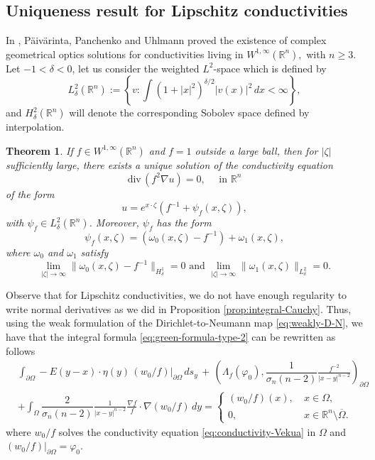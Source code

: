 \documentclass[12pt]{article}
\newtheorem{theorem}{Theorem}
\def\div{\mbox{div}\,}
\def\R{\mathbb{R}}
\begin{document}
\subsection{Uniqueness result for Lipschitz conductivities}
In \cite[Th.\ 1.1]{Paivarinta2003}, P\"{a}iv\"{a}rinta, Panchenko and Uhlmann proved the existence of complex geometrical optics solutions for conductivities living in $W^{1,\infty}(\mathbb{R}^n),$ with $n\geq 3$. Let $-1<\delta<0$, let us consider the weighted $L^2$-space which is defined by 
\[
L_{\delta}^2(\mathbb{R}^n):=\left\{v\colon \int (1+|x|^2)^{\delta/2} |v(x)|^2\, dx<\infty\right\},
\]
and $H_{\delta}^2(\mathbb{R}^n)$ will denote the corresponding Sobolev space defined by interpolation.
\begin{theorem}\cite[Th.\ 1.1]{Paivarinta2003}\label{th:CGO}
If $f\in W^{1,\infty}(\mathbb{R}^n)$ and $f=1$ outside a large ball, then for $|\zeta|$ sufficiently large, there exists a unique solution of the conductivity equation 
\begin{equation}
    \div(f^2\nabla u)=0, \quad \text{ in }\mathbb{R}^n
\end{equation}
of the form 
\begin{equation}\label{eq:CGO-Lipschitz}
u=e^{x\cdot\zeta}\left(f^{-1}+\psi_f(x,\zeta)\right),
\end{equation}
with $\psi_f\in L_{\delta}^2(\mathbb{R}^n)$. Moreover, $\psi_f$ has the form
\begin{equation}
\psi_f(x,\zeta)=\left(\omega_0(x,\zeta)-f^{-1}\right)+\omega_1(x,\zeta),    
\end{equation}
where $\omega_0$ and $ \omega_1$ satisfy
\begin{equation}\label{eq:limits}
\lim_{|\zeta|\rightarrow \infty} \|\omega_0(x,\zeta)-f^{-1}\|_{H_{\delta}^1}=0 \text{ and } \lim_{|\zeta|\rightarrow \infty} \|\omega_1(x,\zeta)\|_{L_{\delta}^2}=0.
\end{equation}
\end{theorem}
 Observe that for Lipschitz conductivities, we do not have enough regularity to write normal derivatives as we did in Proposition \ref{prop:integral-Cauchy}. Thus, using the weak formulation of the Dirichlet-to-Neumann map \eqref{eq:weakly-D-N}, we have that the integral formula \eqref{eq:green-formula-type-2} can be rewritten as follows
\begin{align}\label{eq:rewrite}
&\int_{\partial \Omega} -E(y-x)\cdot \eta(y)\, (w_0/f)|_{\partial\Omega}\, ds_y \,+\, \left(\Lambda_{f}(\varphi_0),\dfrac{1}{\sigma_n(n-2)}\frac{f^{-2}}{|x-y|^{n-2}}\right)_{\partial\Omega}\nonumber\\
&+\int_{\Omega} \dfrac{2}{\sigma_n(n-2)}\frac{1}{|x-y|^{n-2}}\frac{\nabla f}{f}\cdot \nabla (w_0/f) \, dy=\left\{
   \begin{array}{ll}
      (w_0/f)(x), \ & x\in \Omega,\\
      0,           & x\in \R^n\setminus \overline{\Omega}.
   \end{array}
\right.
\end{align}
where $w_0/f$ solves the conductivity equation \eqref{eq:conductivity-Vekua} in $\Omega$ and $(w_0/f)|_{\partial\Omega}=\varphi_0$.
\end{document}
